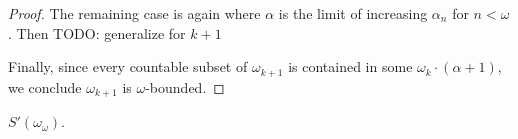 \documentclass[11pt]{article}
\begin{document}
\begin{proof}
    The remaining case is again where \(\alpha\) is the limit of increasing
    \(\alpha_n\) for \(n<\omega\). Then
    TODO: generalize for \(k+1\)

    Finally, since every countable subset of \(\omega_{k+1}\) is contained in
    some \(\omega_k\cdot(\alpha+1)\), we conclude \(\omega_{k+1}\) is
    \(\omega\)-bounded.
  \end{proof}

  \begin{theorem*}
    \(S'(\omega_\omega)\).
  \end{theorem*}
\end{document}
